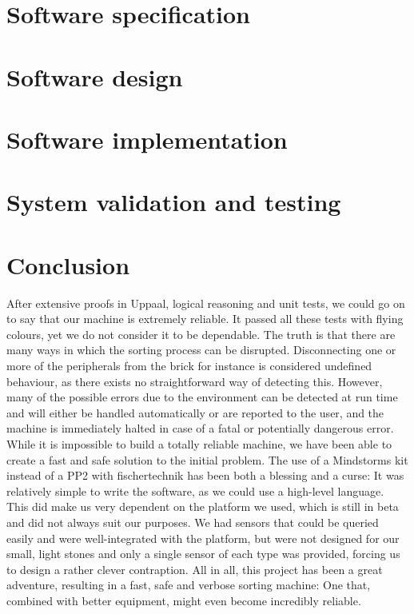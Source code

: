 \documentclass[a4paper,oneside,11pt]{report}
\begin{document}
\chapter {Software specification}
 

\chapter{Software design}


\chapter{Software implementation}


\chapter{System validation and testing}


\chapter{Conclusion}
After extensive proofs in Uppaal, logical reasoning and unit tests, we could go on to say that our machine is extremely reliable. It passed all these tests with flying colours, yet we do not consider it to be dependable. The truth is that there are many ways in which the sorting process can be disrupted. Disconnecting one or more of the peripherals from the brick for instance is considered undefined behaviour, as there exists no straightforward way of detecting this. However, many of the possible errors due to the environment can be detected at run time and will either be handled automatically or are reported to the user, and the machine is immediately halted in case of a fatal or potentially dangerous error.
While it is impossible to build a totally reliable machine, we have been able to create a fast and safe solution to the initial problem. The use of a Mindstorms kit instead of a PP2 with fischertechnik has been both a blessing and a curse: It was relatively simple to write the software, as we could use a high-level language. This did make us very dependent on the platform we used, which is still in beta and did not always suit our purposes. We had sensors that could be queried easily and were well-integrated with the platform, but were not designed for our small, light stones and only a single sensor of each type was provided, forcing us to design a rather clever contraption.
All in all, this project has been a great adventure, resulting in a fast, safe and verbose sorting machine: One that, combined with better equipment, might even become incredibly reliable.
\end{document}
